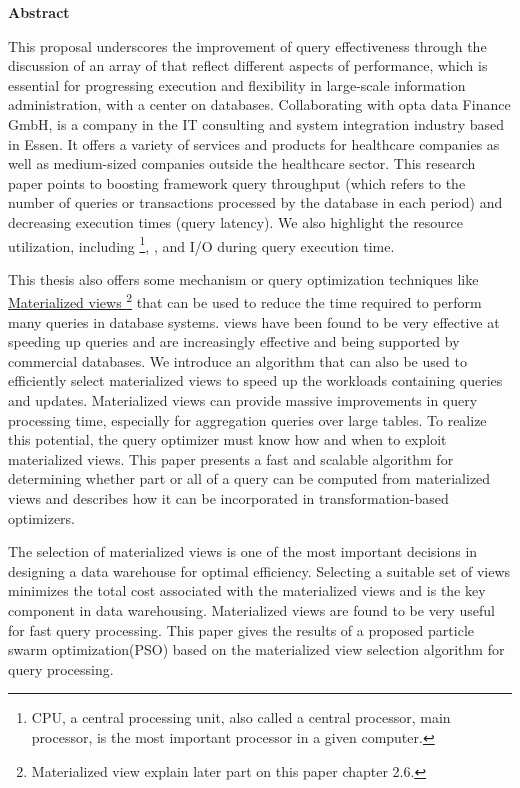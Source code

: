 \thispagestyle{empty}
\begin{center}
    \fancyhead[]{}\Large\textbf{Abstract}
\end{center}

\normalsize
This proposal underscores the improvement of query effectiveness through the discussion of an array of  that reflect different aspects of performance, which is essential for progressing execution and flexibility in large-scale information administration, with a center on databases. Collaborating with opta data Finance GmbH, is a company in the IT consulting and system integration industry based in Essen. It offers a variety of services and products for healthcare companies as well as medium-sized companies outside the healthcare sector. This research paper points to boosting framework query throughput (which refers to the number of queries or transactions processed by the database in each period) and decreasing execution times (query latency). We also highlight the resource utilization,  including \footnote{CPU, a central processing unit, also called a central processor, main processor, is the most important processor in a given computer.}, , and I/O during query execution time.\vspace{.4cm}

This thesis also offers some mechanism or query optimization techniques like \hyperref[term:materialized_views]{Materialized views \footnote{Materialized view explain later part on this paper chapter 2.6.}} that can be used to reduce the time required to perform many queries in database systems.  views have been found to be very effective at speeding up queries and are increasingly effective and being supported by commercial databases. We introduce an algorithm that can also be used to efficiently select materialized views to speed up the workloads containing queries and updates. Materialized views can provide massive improvements in query processing time, especially for aggregation queries over large tables. To realize this potential, the query optimizer must know how and when to exploit materialized views. This paper presents a fast and scalable algorithm for determining whether part or all of a query can be computed from materialized views and describes how it can be incorporated in transformation-based optimizers.\vspace{.4cm}

The selection of materialized views is one of the most important decisions in designing a data warehouse for optimal efficiency. Selecting a suitable set of views minimizes the total cost associated with the materialized views and is the key component in data warehousing. Materialized views are found to be very useful for fast query processing. This paper gives the results of a proposed particle swarm optimization(PSO) based on the materialized view selection algorithm for query processing.\vspace{.4cm}



